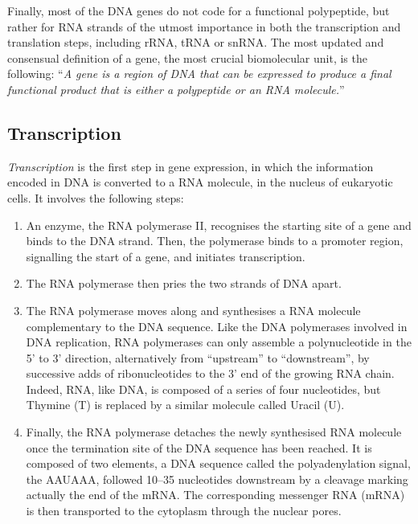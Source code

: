 Finally, most of the DNA genes do not code for a functional polypeptide, but rather for RNA strands of the utmost importance in both the transcription and translation steps, including rRNA, tRNA or snRNA. The most updated and consensual definition of a gene, the most crucial biomolecular unit, is the following: \enquote{\textit{A gene is a region of DNA that can be expressed to produce a final functional product that is either a polypeptide or an RNA molecule.}}


\subsection{Transcription}
\label{subsec:transcript}

\textit{Transcription} is the first step in gene expression, in which the information encoded in DNA is converted to a RNA molecule, in the nucleus of eukaryotic cells.  It involves the following steps:

\begin{enumerate}
    \item[Initiation and promoter recognition:] An enzyme, the RNA polymerase II, recognises the starting site of a gene and binds to the DNA strand. Then, the polymerase binds to a promoter region, signalling the start of a gene, and initiates transcription.
    \item[Strand separation:] The RNA polymerase then pries the two strands of DNA apart.  
    \item[Elongation:] The RNA polymerase moves along and synthesises a RNA molecule complementary to the DNA sequence. Like the DNA polymerases involved in DNA replication, RNA polymerases can only assemble a polynucleotide in the 5' to 3' direction, alternatively from \enquote{upstream} to \enquote{downstream}, by successive adds of ribonucleotides to the 3' end of the growing RNA chain. Indeed, RNA, like DNA, is composed of a series of four nucleotides, but Thymine (T) is replaced by a similar molecule called Uracil (U).
    \item[Termination:] Finally, the RNA polymerase detaches the newly synthesised RNA molecule once the termination site of the DNA sequence has been reached. It is composed of two elements, a DNA sequence called the polyadenylation signal, the AAUAAA, followed 10–35 nucleotides downstream by a cleavage marking actually the end of the mRNA. The corresponding messenger RNA (mRNA) is then transported to the cytoplasm through the nuclear pores.  
\end{enumerate}

